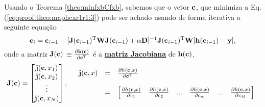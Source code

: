 \begin{myproofT}
Usando o Teorema \ref{theo:minfxbCfxb}, sabemos que o vetor $\VECTOR{c}$,
que minimiza a Eq. (\ref{eq:proof:theo:maphcxr1r1:3}) pode ser achado usando 
de forma iterativa a seguinte equação
\begin{equation}\label{eq:proof:theo:maphcxr1r1:5}
\VECTOR{c}_{i}=\VECTOR{c}_{i-1}-[\MATRIX{J}(\VECTOR{c}_{i-1})^{\transpose}\MATRIX{W}\MATRIX{J}(\VECTOR{c}_{i-1})+\alpha \MATRIX{D}]^{-1}\MATRIX{J}(\VECTOR{c}_{i-1})^{\transpose}\MATRIX{W}[\VECTOR{h}(\VECTOR{c}_{i-1})-\VECTOR{y}],
\end{equation}
onde a matriz $\MATRIX{J}(\VECTOR{c})$ 
$\equiv \frac{\partial \VECTOR{h}(\VECTOR{c})}{\partial \VECTOR{c}^{\transpose}}$ é a 
\hyperref[def:jacobian]{\textbf{matriz Jacobiana}}  de $\VECTOR{h}(\VECTOR{c})$,
\begin{equation}
\MATRIX{J}(\VECTOR{c})=\begin{bmatrix}
\VECTOR{j}(\VECTOR{c},x_1)\\ 
\VECTOR{j}(\VECTOR{c},x_2)\\ 
\vdots\\ 
\VECTOR{j}(\VECTOR{c},x_N)
\end{bmatrix},
\quad
\begin{array}{lll}
\VECTOR{j}(\VECTOR{c},x) & = & \frac{\partial h(\VECTOR{c},x)}{\partial \VECTOR{c}^{\transpose}} \\
                       ~ & ~ & ~\\
                       ~ & = & \left[\frac{\partial h(\VECTOR{c},x)}{\partial c_1}\quad \frac{\partial h(\VECTOR{c},x)}{\partial c_2}\quad ...\quad \frac{\partial h(\VECTOR{c},x)}{\partial c_{m}} \quad ... \quad \frac{\partial h(\VECTOR{c},x)}{\partial c_{M}} \right]
\end{array}
\end{equation}
\end{myproofT}

